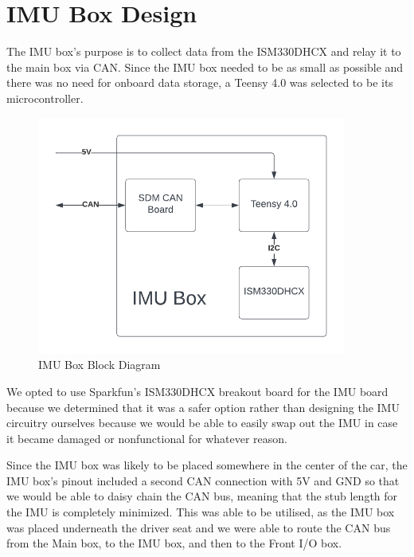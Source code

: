\section{IMU Box Design}
The IMU box's purpose is to collect data from the ISM330DHCX and relay it to the main box via CAN.
Since the IMU box needed to be as small as possible and there was no need for onboard data storage, a Teensy 4.0 was selected to be its microcontroller.
\begin{figure}[H]
    \centering
    \includegraphics[width=4in]{images/SDM-23 IMU Box Block Diagram .png}
    \caption{IMU Box Block Diagram}
    \label{fig:sdm23imuboxblock}
\end{figure}
We opted to use Sparkfun's ISM330DHCX breakout board for the IMU board because we determined that it was a safer option rather than designing the IMU circuitry ourselves because we would be able to easily swap out the IMU in case it became damaged or nonfunctional for whatever reason.
\vspace{1em}

Since the IMU box was likely to be placed somewhere in the center of the car, the IMU box's pinout included a second CAN connection with 5V and GND so that we would be able to daisy chain the CAN bus, meaning that the stub length for the IMU is completely minimized.
This was able to be utilised, as the IMU box was placed underneath the driver seat and we were able to route the CAN bus from the Main box, to the IMU box, and then to the Front I/O box.
\vspace{1em}

